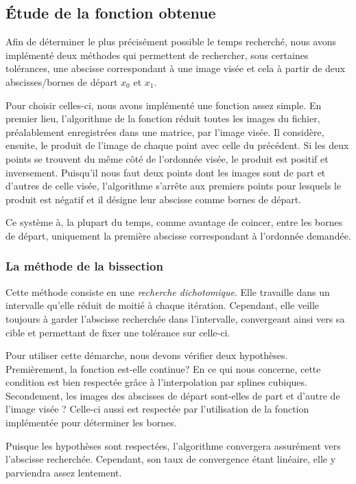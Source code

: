 \documentclass[a4paper, 12pt]{article}
\begin{document}
	\subsection{Étude de la fonction obtenue}
	Afin de déterminer le plus précisément possible le temps recherché, nous avons implémenté deux méthodes qui permettent de rechercher, sous certaines tolérances, une abscisse correspondant à une image visée et cela à partir de deux abscisses/bornes de départ $x_{0}$ et $x_{1}$. \par
	Pour choisir celles-ci, nous avons implémenté une fonction assez simple.
	En premier lieu, l'algorithme de la fonction réduit toutes les images du fichier, préalablement enregistrées dans une matrice, par l'image visée. Il considère, ensuite, le produit de l'image de chaque point avec celle du précédent. Si les deux points se trouvent du \og même côté \fg{} de l'ordonnée visée, le produit est positif et inversement. Puisqu'il nous faut deux points dont les images sont de part et d'autres de celle visée, l'algorithme s'arrête aux premiers points pour lesquels le produit est négatif et il désigne leur abscisse comme bornes de départ.\par
	Ce système à, la plupart du temps, comme avantage de coincer, entre les bornes de départ, uniquement la première abscisse correspondant à l'ordonnée demandée.
	\subsubsection{La méthode de la bissection}
	Cette méthode consiste en une \textit{recherche dichotomique}. Elle travaille dans un intervalle qu'elle réduit de moitié à chaque itération. Cependant, elle veille toujours à garder l'abscisse recherchée dans l'intervalle, convergeant ainsi vers sa cible et permettant de fixer une tolérance sur celle-ci.\par
	Pour utiliser cette démarche, nous devons vérifier deux hypothèses. Premièrement, la fonction est-elle continue? En ce qui nous concerne, cette condition est bien respectée grâce à l'interpolation par splines cubiques. Secondement, les images des abscisses de départ sont-elles de part et d'autre de l'image visée ? Celle-ci aussi est respectée par l'utilisation de la fonction implémentée pour déterminer les bornes.\par 
	Puisque les hypothèses sont respectées, l'algorithme convergera assurément vers l'abscisse recherchée. Cependant, son taux de convergence étant linéaire, elle y parviendra assez lentement.
\end{document}
